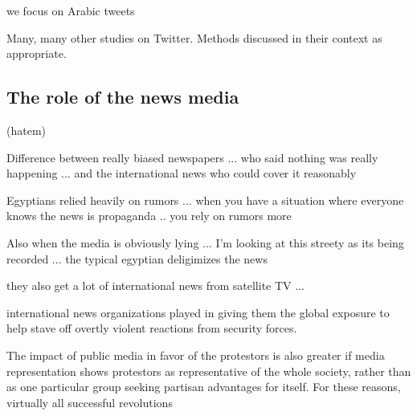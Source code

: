 	we focus on Arabic tweets
	
	
Many, many other studies on Twitter. Methods discussed in their context as appropriate.

	
\subsection{The role of the news media}

(hatem)

Difference between really biased newspapers ... who said nothing was really happening ... and the international news who could cover it reasonably

Egyptians relied heavily on rumors ... when you have a situation where everyone knows the news is propaganda .. you rely on rumors more  

    Also when the media is obviously lying ... I'm looking at this streety as its being recorded ... the typical egyptian deligimizes the news

	they also get a lot of international news from satellite TV ... 

\cite{hussain_what_2013}
 international news organizations played in giving them the global exposure
to help stave off overtly violent reactions from security forces.

\citep{goldstone_cross-class_2011}

The impact
of public media in favor of the protestors is also greater if media representation shows
protestors as representative of the whole society, rather than as one particular group
seeking partisan advantages for itself.
For these reasons, virtually all successful revolutions


